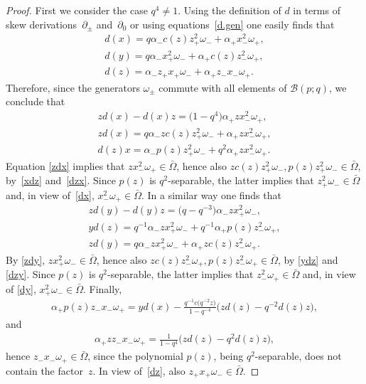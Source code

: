 \documentclass[10pt,a4paper]{amsart}
\numberwithin{equation}{section}
\def\Weyl#1#2{{\mathcal{B}}(#1;#2)}
\begin{document}
\begin{proof}
First we consider the case $q^4\neq 1$. Using the def\/inition of $d$ in terms of skew derivations~$\partial_\pm$ and~$\partial_0$ or using equations~\eqref{d.gen} one easily f\/inds that
\begin{subequations}\label{d.gen.B}
\begin{gather}
d(x) = q\alpha_-c(z)z_+^2\omega_- + \alpha_+x_-^2 \omega_+, \label{dx}
\\
d(y) = q\alpha_-x_+^2\omega_- + \alpha_+c(z)z_-^2\omega_+ , \label{dy}
\\
d(z) = \alpha_-z_+x_+\omega_- + \alpha_+z_-x_- \omega_+. \label{dz}
\end{gather}
\end{subequations}
Therefore, since the generators $\omega_\pm$ commute with all elements of $\Weyl p q$, we conclude that
\begin{subequations}\label{xdz+zdx}
\begin{gather}
zd(x) - d(x)z = \big(1-q^4\big)\alpha_+ zx_-^2 \omega_+, \label{zdx}
\\
zd(x) = q\alpha_-zc(z)z_+^2\omega_- + \alpha_+zx_-^2 \omega_+, \label{xdz}
\\
d(z)x = \alpha_-p(z)z_+^2\omega_- + q^2\alpha_+zx_-^2 \omega_+. \label{dzx}
\end{gather}
\end{subequations}
Equation \eqref{zdx} implies that $zx_-^2 \omega_+\in \bar\Omega$, hence also $zc(z)z_+^2\omega_- , p(z)z_+^2\omega_- \in \bar\Omega$, by~\eqref{xdz} and~\eqref{dzx}. Since $p(z)$ is $q^2$-separable, the latter implies that $z_+^2\omega_- \in \bar\Omega$ and, in view of~\eqref{dx}, $x_-^2\omega_+\in \bar\Omega$. In a similar way one f\/inds that
\begin{subequations}\label{ydz+zdy}
\begin{gather}
zd(y) - d(y)z = \big(q-q^{-3}\big)\alpha_- zx_+^2 \omega_-, \label{zdy}
\\
yd(z) = q^{-1}\alpha_-zx_+^2\omega_- + q^{-1}\alpha_+p(z)z_-^2 \omega_+, \label{ydz}
\\
zd(y) = q\alpha_-zx_+^2\omega_- + \alpha_+zc(z)z_-^2 \omega_+. \label{dzy}
\end{gather}
\end{subequations}
By \eqref{zdy}, $zx_+^2 \omega_-\in \bar\Omega$, hence also $zc(z)z_-^2\omega_+, p(z)z_-^2\omega_+ \in \bar\Omega$, by \eqref{ydz} and \eqref{dzy}. Since $p(z)$ is $q^2$-separable, the latter implies that $z_-^2\omega_+ \in \bar\Omega$ and, in view of \eqref{dy}, $x_+^2\omega_-\in \bar\Omega$. Finally,
\begin{gather*}
\alpha_+ p(z)z_-x_-\omega_+ = yd(x) - \frac{q^{-1}c\big(q^{-2}z\big)}{1-q^{-4}}\big(zd(z) - q^{-2}d(z)z\big),
\end{gather*}
and
\begin{gather*}
\alpha_+ zz_-x_-\omega_+ =\frac{1}{1-q^{4}}\big(zd(z) - q^{2}d(z)z\big),
\end{gather*}
hence $z_-x_-\omega_+ \in \bar \Omega$, since the polynomial $p(z)$, being $q^2$-separable, does not contain the factor~$z$. In view of~\eqref{dz},
also $z_+x_+\omega_- \in \bar \Omega$.


\end{proof}
\end{document}
